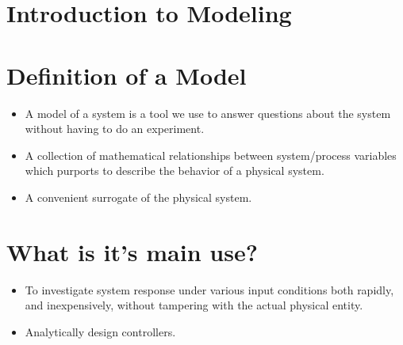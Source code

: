 \documentclass[../notes-main.tex]{subfiles}
\begin{document}
\section{Introduction to Modeling}
\begin{mdframed}
    \begin{center}
    \end{center}
\end{mdframed}
\label{fig:modeling-intro}
\section{Definition of a Model}
\begin{itemize}
    \item A model of a system is a tool we use to answer questions about the system without having to do an experiment.
    \item A collection of mathematical relationships between system/process variables which purports to describe the behavior of a physical system.
    \item A convenient surrogate of the physical system.
\end{itemize}
\section{What is it's main use?}
\begin{itemize}
    \item To investigate system response under various input conditions both rapidly, and inexpensively, without tampering with the actual physical entity.
    \item Analytically design controllers.
\end{itemize}
\end{document}
